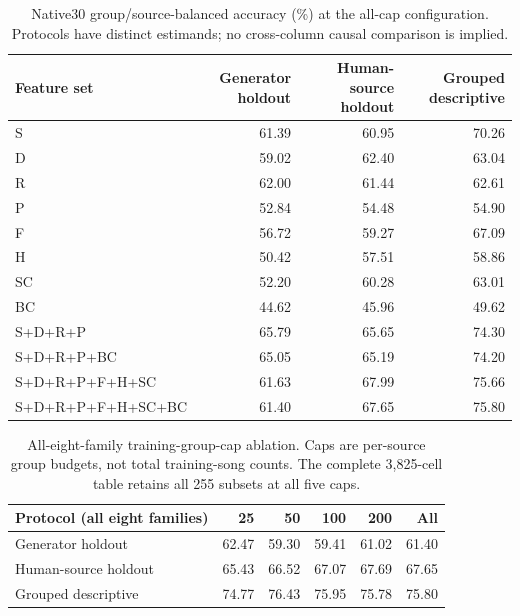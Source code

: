 \begin{table}[htbp]\centering\small
\begin{tabular}{lrrr}\toprule
Feature set & Generator holdout & Human-source holdout & Grouped descriptive\\\midrule
S & 61.39 & 60.95 & 70.26\\
D & 59.02 & 62.40 & 63.04\\
R & 62.00 & 61.44 & 62.61\\
P & 52.84 & 54.48 & 54.90\\
F & 56.72 & 59.27 & 67.09\\
H & 50.42 & 57.51 & 58.86\\
SC & 52.20 & 60.28 & 63.01\\
BC & 44.62 & 45.96 & 49.62\\
S+D+R+P & 65.79 & 65.65 & 74.30\\
S+D+R+P+BC & 65.05 & 65.19 & 74.20\\
S+D+R+P+F+H+SC & 61.63 & 67.99 & 75.66\\
S+D+R+P+F+H+SC+BC & 61.40 & 67.65 & 75.80\\
\bottomrule\end{tabular}
\caption{Native30 group/source-balanced accuracy (\%) at the all-cap configuration. Protocols have distinct estimands; no cross-column causal comparison is implied.}
\label{tab:bc-allcap}\end{table}
\begin{table}[htbp]\centering\small
\begin{tabular}{lrrrrr}\toprule
Protocol (all eight families) & 25 & 50 & 100 & 200 & All\\\midrule
Generator holdout & 62.47 & 59.30 & 59.41 & 61.02 & 61.40\\
Human-source holdout & 65.43 & 66.52 & 67.07 & 67.69 & 67.65\\
Grouped descriptive & 74.77 & 76.43 & 75.95 & 75.78 & 75.80\\
\bottomrule\end{tabular}
\caption{All-eight-family training-group-cap ablation. Caps are per-source group budgets, not total training-song counts. The complete 3,825-cell table retains all 255 subsets at all five caps.}
\label{tab:bc-caps}\end{table}
